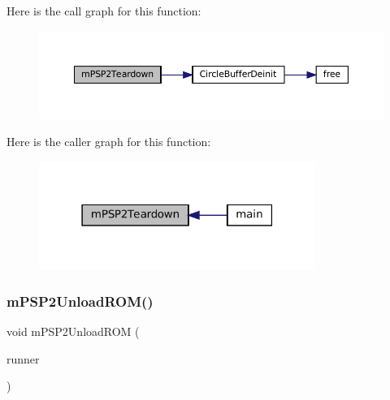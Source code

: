 Here is the call graph for this function\+:
\nopagebreak
\begin{figure}[H]
\begin{center}
\leavevmode
\includegraphics[width=350pt]{psp2-context_8c_aaae5f4b3a42c091f809836cec74d1cd7_cgraph}
\end{center}
\end{figure}
Here is the caller graph for this function\+:
\nopagebreak
\begin{figure}[H]
\begin{center}
\leavevmode
\includegraphics[width=255pt]{psp2-context_8c_aaae5f4b3a42c091f809836cec74d1cd7_icgraph}
\end{center}
\end{figure}
\mbox{\label{psp2-context_8c_a94ad5d2964da6bad167ee85e5f021421}} 
\subsubsection{\texorpdfstring{m\+P\+S\+P2\+Unload\+R\+O\+M()}{mPSP2UnloadROM()}}
{\footnotesize\ttfamily void m\+P\+S\+P2\+Unload\+R\+OM (\begin{DoxyParamCaption}\item[{struct \mbox{\hyperlink{structm_g_u_i_runner}{m\+G\+U\+I\+Runner}} $\ast$}]{runner }\end{DoxyParamCaption})}


